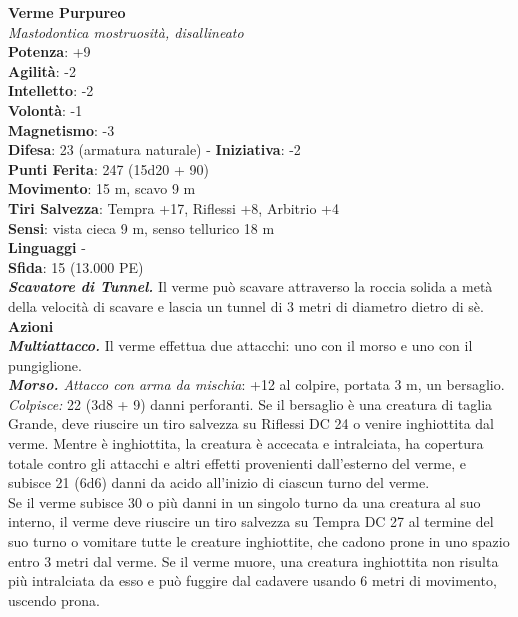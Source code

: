 \begin{multicols}{2}
\medskip\textbf{Verme Purpureo}\\
\emph{Mastodontica mostruosità, disallineato}\\
\textbf{Potenza}: +9\\
\textbf{Agilità}: -2\\
\textbf{Intelletto}: -2\\
\textbf{Volontà}: -1\\
\textbf{Magnetismo}: -3\\
\textbf{Difesa}: 23 (armatura naturale) - \textbf{Iniziativa}: -2\\
\textbf{Punti Ferita}: 247 (15d20 + 90)\\
\textbf{Movimento}: 15 m, scavo 9 m\\
\textbf{Tiri Salvezza}: Tempra +17, Riflessi +8, Arbitrio +4\\
\textbf{Sensi}: vista cieca 9 m, senso tellurico 18 m\\
\textbf{Linguaggi} -\\
\textbf{Sfida}: 15 (13.000 PE)\smallskip\\
\emph{\textbf{Scavatore di Tunnel.}} Il verme può scavare attraverso la roccia solida a metà della velocità di scavare e lascia un tunnel di 3 metri di diametro dietro di sè.\\
\smallskip\textbf{Azioni}\\
\emph{\textbf{Multiattacco.}} Il verme effettua due attacchi: uno con il morso e uno con il pungiglione.\\
\emph{\textbf{Morso.} Attacco con arma da mischia}: +12 al colpire, portata 3 m, un bersaglio.\\
\emph{Colpisce:} 22 (3d8 + 9) danni perforanti. Se il bersaglio è una creatura di taglia Grande, deve riuscire un tiro salvezza su Riflessi DC  24 o venire inghiottita dal verme. Mentre è inghiottita, la creatura è accecata e intralciata, ha copertura totale contro gli attacchi e altri effetti provenienti dall'esterno del verme, e subisce 21 (6d6) danni da acido all'inizio di ciascun turno del verme.\\
Se il verme subisce 30 o più danni in un singolo turno da una creatura al suo interno, il verme deve riuscire un tiro salvezza su Tempra DC  27 al termine del suo turno o vomitare tutte le creature inghiottite, che cadono prone in uno spazio entro 3 metri dal verme. Se il verme muore, una creatura inghiottita non risulta più intralciata da esso e può fuggire dal cadavere usando 6 metri di movimento, uscendo prona.\\


\end{multicols}
